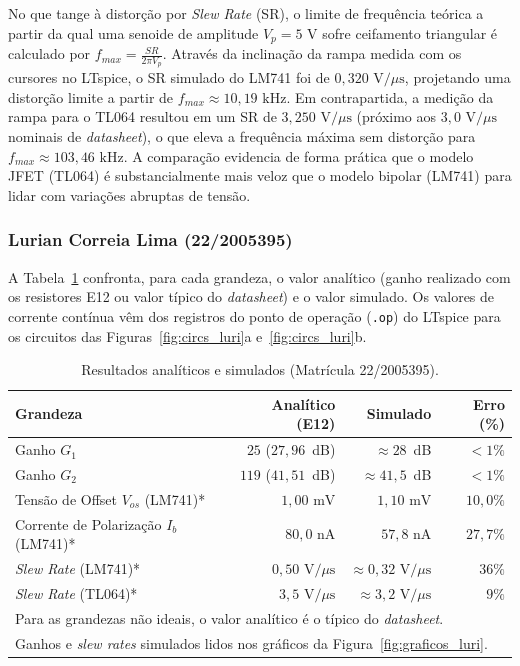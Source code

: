 \documentclass[11pt,a4paper]{article}
\begin{document}
No que tange à distorção por \textit{Slew Rate} (SR), o limite de frequência teórica a partir da qual uma senoide de amplitude $V_p = 5\text{ V}$ sofre ceifamento triangular é calculado por $f_{max} = \frac{SR}{2\pi V_p}$. Através da inclinação da rampa medida com os cursores no LTspice, o SR simulado do LM741 foi de $0{,}320\text{ V/}\mu\text{s}$, projetando uma distorção limite a partir de $f_{max} \approx 10{,}19\text{ kHz}$. Em contrapartida, a medição da rampa para o TL064 resultou em um SR de $3{,}250\text{ V/}\mu\text{s}$ (próximo aos $3{,}0\text{ V/}\mu\text{s}$ nominais de \textit{datasheet}), o que eleva a frequência máxima sem distorção para $f_{max} \approx 103{,}46\text{ kHz}$. A comparação evidencia de forma prática que o modelo JFET (TL064) é substancialmente mais veloz que o modelo bipolar (LM741) para lidar com variações abruptas de tensão.

\subsubsection{Lurian Correia Lima (22/2005395)}

A Tabela~\ref{tab:resultados_luri} confronta, para cada grandeza, o valor analítico (ganho realizado com os resistores E12 ou valor típico do \textit{datasheet}) e o valor simulado. Os valores de corrente contínua vêm dos registros do ponto de operação (\texttt{.op}) do LTspice para os circuitos das Figuras~\ref{fig:circs_luri}a e~\ref{fig:circs_luri}b.

\begin{table}[H]
    \centering
    \caption{Resultados analíticos e simulados (Matrícula 22/2005395).}
    \label{tab:resultados_luri}
    \renewcommand{\arraystretch}{1.2}
    \begin{tabular}{@{}lrrr@{}}
    \toprule
    \textbf{Grandeza} & \textbf{Analítico (E12)} & \textbf{Simulado} & \textbf{Erro (\%)} \\
    \midrule
    Ganho $G_1$ & $25$ ($27{,}96$~dB) & $\approx28$~dB & $<1\%$ \\
    Ganho $G_2$ & $119$ ($41{,}51$~dB) & $\approx41{,}5$~dB & $<1\%$ \\
    Tensão de Offset $V_{os}$ (LM741)* & $1{,}00\text{ mV}$ & $1{,}10\text{ mV}$ & $10{,}0\%$ \\
    Corrente de Polarização $I_b$ (LM741)* & $80{,}0\text{ nA}$ & $57{,}8\text{ nA}$ & $27{,}7\%$ \\
    \textit{Slew Rate} (LM741)* & $0{,}50\text{ V/}\mu\text{s}$ & $\approx0{,}32\text{ V/}\mu\text{s}$ & $36\%$ \\
    \textit{Slew Rate} (TL064)* & $3{,}5\text{ V/}\mu\text{s}$ & $\approx3{,}2\text{ V/}\mu\text{s}$ & $9\%$ \\
    \bottomrule
    \multicolumn{4}{l}{\footnotesize * Para as grandezas não ideais, o valor analítico é o típico do \textit{datasheet}.} \\
    \multicolumn{4}{l}{\footnotesize \phantom{*} Ganhos e \textit{slew rates} simulados lidos nos gráficos da Figura~\ref{fig:graficos_luri}.}
    \end{tabular}
\end{table}
\end{document}

